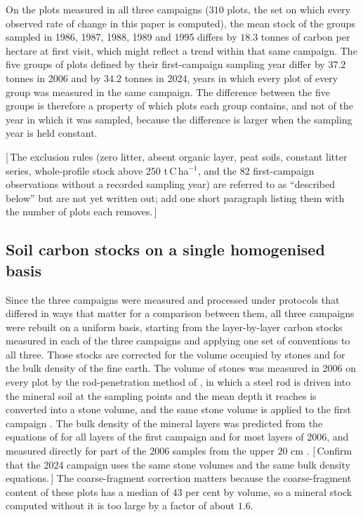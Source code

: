 \documentclass[11pt]{article}
\newcommand{\gap}[1]{\textcolor{red!70!black}{\small[\,#1\,]}}
\begin{document}
On the plots measured in all three campaigns ($310$ plots, the set on which every observed
rate of change in this paper is computed), the mean stock of the groups sampled in 1986,
1987, 1988, 1989 and 1995 differs by $18.3$ tonnes of carbon per hectare at first visit,
which might reflect a trend within that same campaign. The five groups of plots defined by
their first-campaign sampling year differ by $37.2$ tonnes in 2006 and by $34.2$ tonnes in
2024, years in which every plot of every group was measured in the same campaign. The
difference between the five groups is therefore a property of which plots each group
contains, and not of the year in which it was sampled, because the difference is larger
when the sampling year is held constant.

\gap{The exclusion rules (zero litter, absent organic layer, peat soils, constant litter
series, whole-profile stock above 250 t\,C\,ha$^{-1}$, and the 82 first-campaign observations
without a recorded sampling year) are referred to as ``described below''
but are not yet written out; add one short paragraph listing them with the number of plots
each removes.}

\subsection{Soil carbon stocks on a single homogenised basis}\label{sec:soc}

Since the three campaigns were measured and processed under protocols that differed in
ways that matter for a comparison between them, all three campaigns were rebuilt on a
uniform basis, starting from the layer-by-layer carbon stocks measured in each of the three
campaigns and applying one set of conventions to all three. Those stocks are corrected for
the volume occupied by stones and for the bulk density of the fine earth. The volume of
stones was measured in 2006 on every plot by the rod-penetration method of
\citet{Viro1952}, in which a steel rod is driven into the mineral soil at the sampling
points and the mean depth it reaches is converted into a stone volume, and the same stone
volume is applied to the first campaign \citep{Lehtonen2016,Kramarenko}. The bulk density of
the mineral layers was predicted from the equations of \citet{TamminenStarr1994} for all
layers of the first campaign and for most layers of 2006, and measured directly for part of
the 2006 samples from the upper $20$ cm \citep{Kramarenko}. \gap{Confirm that the 2024
campaign uses the same stone volumes and the same bulk density equations.} The
coarse-fragment correction matters because the coarse-fragment content of these plots has a
median of $43$ per cent by volume, so a mineral stock computed without it is too large by a
factor of about $1.6$.
\end{document}
